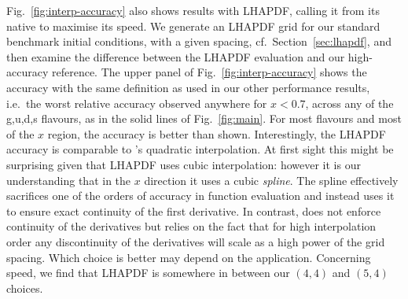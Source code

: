 Fig.~\ref{fig:interp-accuracy} also shows results with LHAPDF, calling
it from its native \CPP to maximise its speed.
%
We generate an LHAPDF grid for our standard benchmark initial
conditions, with a given  spacing, cf.\
Section~\ref{sec:lhapdf}, and then examine the difference between the
LHAPDF evaluation and our high-accuracy reference.
%
The upper panel of Fig.~\ref{fig:interp-accuracy} shows the accuracy
with the same definition as used in our other performance results,
i.e.\ the worst relative accuracy observed anywhere for $x < 0.7$,
across any of the g,u,d,s flavours, as in the solid lines of
Fig.~\ref{fig:main}.
%
For most flavours and most of the $x$ region, the accuracy is better
than shown.
%
Interestingly, the LHAPDF accuracy is comparable to \hoppet's
quadratic interpolation.
%
At first sight this might be surprising given that LHAPDF uses cubic
interpolation: however it is our understanding that in the $x$
direction it uses a cubic \emph{spline}.
%
The spline effectively sacrifices one of the orders of accuracy in
function evaluation and instead uses it to ensure exact continuity of
the first derivative.
%
In contrast, \hoppet does not enforce continuity of the derivatives
but relies on the fact that for high interpolation order any
discontinuity of the derivatives will scale as a high power of the
grid spacing. 
%
Which choice is better may depend on the application. 
%
Concerning speed, we find that LHAPDF is somewhere in between our
$(4,4)$ and $(5,4)$ choices.

